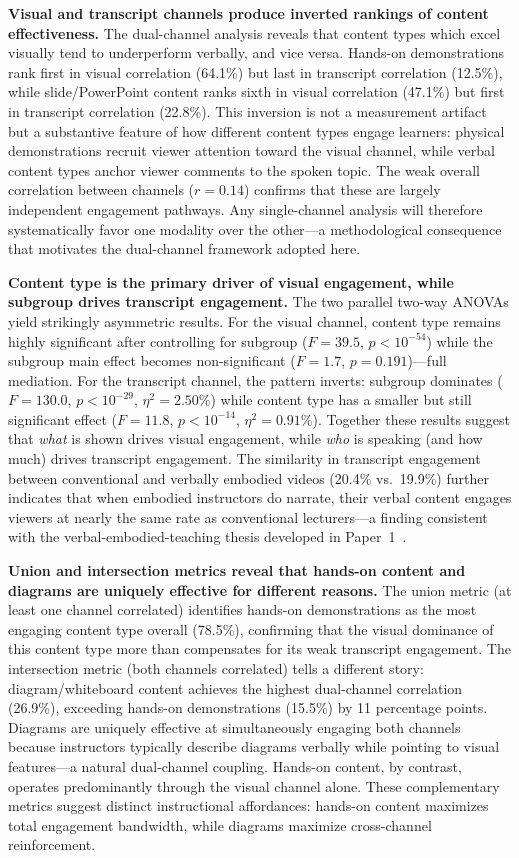 \documentclass[fleqn,10pt]{wlscirep}
\begin{document}
\textbf{Visual and transcript channels produce inverted rankings of content effectiveness.} The dual-channel analysis reveals that content types which excel visually tend to underperform verbally, and vice versa. Hands-on demonstrations rank first in visual correlation (64.1\%) but last in transcript correlation (12.5\%), while slide/PowerPoint content ranks sixth in visual correlation (47.1\%) but first in transcript correlation (22.8\%). This inversion is not a measurement artifact but a substantive feature of how different content types engage learners: physical demonstrations recruit viewer attention toward the visual channel, while verbal content types anchor viewer comments to the spoken topic. The weak overall correlation between channels ($r = 0.14$) confirms that these are largely independent engagement pathways. Any single-channel analysis will therefore systematically favor one modality over the other---a methodological consequence that motivates the dual-channel framework adopted here.

\textbf{Content type is the primary driver of visual engagement, while subgroup drives transcript engagement.} The two parallel two-way ANOVAs yield strikingly asymmetric results. For the visual channel, content type remains highly significant after controlling for subgroup ($F = 39.5$, $p < 10^{-54}$) while the subgroup main effect becomes non-significant ($F = 1.7$, $p = 0.191$)---full mediation. For the transcript channel, the pattern inverts: subgroup dominates ($F = 130.0$, $p < 10^{-29}$, $\eta^2 = 2.50\%$) while content type has a smaller but still significant effect ($F = 11.8$, $p < 10^{-14}$, $\eta^2 = 0.91\%$). Together these results suggest that \emph{what} is shown drives visual engagement, while \emph{who} is speaking (and how much) drives transcript engagement. The similarity in transcript engagement between conventional and verbally embodied videos (20.4\% vs.\ 19.9\%) further indicates that when embodied instructors do narrate, their verbal content engages viewers at nearly the same rate as conventional lecturers---a finding consistent with the verbal-embodied-teaching thesis developed in Paper~1~\cite{zhang2025transcript}.

\textbf{Union and intersection metrics reveal that hands-on content and diagrams are uniquely effective for different reasons.} The union metric (at least one channel correlated) identifies hands-on demonstrations as the most engaging content type overall (78.5\%), confirming that the visual dominance of this content type more than compensates for its weak transcript engagement. The intersection metric (both channels correlated) tells a different story: diagram/whiteboard content achieves the highest dual-channel correlation (26.9\%), exceeding hands-on demonstrations (15.5\%) by 11 percentage points. Diagrams are uniquely effective at simultaneously engaging both channels because instructors typically describe diagrams verbally while pointing to visual features---a natural dual-channel coupling. Hands-on content, by contrast, operates predominantly through the visual channel alone. These complementary metrics suggest distinct instructional affordances: hands-on content maximizes total engagement bandwidth, while diagrams maximize cross-channel reinforcement.
\end{document}
